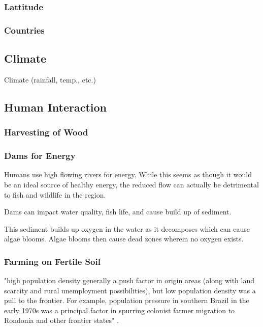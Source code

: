 \documentclass[paper=a4, fontsize=11pt]{article}
\begin{document}
\subsubsection{Lattitude}

\subsubsection{Countries}

\subsection{Climate}
Climate (rainfall, temp., etc.)


\subsection{Human Interaction}


\subsubsection{Harvesting of Wood}

\subsubsection{Dams for Energy}
Humans use high flowing rivers for energy. While this seems as though it would be an ideal source of healthy energy, the reduced flow can actually be detrimental to 
fish and wildlife in the region. 

Dams can impact water quality, fish life, and cause build up of sediment. 

This sediment builds up oxygen in the water as it decomposes which can cause algae blooms. Algae blooms then cause 
dead zones wherein no oxygen exists. \cite{dd}


 

\subsubsection{Farming on Fertile Soil}
"high population density generally a 
push factor in origin areas (along with land 
scarcity and rural unemployment possibilities), 
but low population density was a pull to the 
frontier. For example, population pressure 
in southern Brazil in the early 1970s was a 
principal factor in spurring colonist farmer 
migration to Rondonia and other frontier states" \cite{population_deforrest}.
\end{document}
